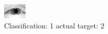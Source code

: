 \begin{figure}[h!]
\begin{center}
\includegraphics[width=0.60\columnwidth]{figures/ID2345_class_1_target_2.png}
\end{center}
\caption{ Classification: 1 actual target: 2}
\label{fig:ID2345_class_1_target_2}
\end{figure}
